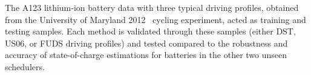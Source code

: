The A123 lithium-ion battery data with three typical driving profiles, obtained from the University of Maryland 2012~\cite{noauthor_calce_2017} cycling experiment, acted as training and testing samples.
Each method is validated through these samples (either DST, US06, or FUDS driving profiles) and tested compared to the robustness and accuracy of state-of-charge estimations for batteries in the other two unseen schedulers.

